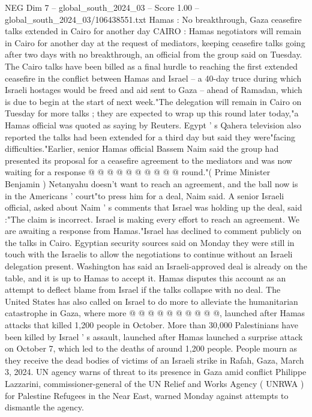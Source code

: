 \begin{textsample}{NEG Dim 7 – global\_south\_2024\_03 – Score 1.00 – global\_south\_2024\_03/106438551.txt}  \label{ex:f7_neg_296}
Hamas : No breakthrough, Gaza ceasefire talks extended in Cairo for another day CAIRO : Hamas negotiators will remain in Cairo for another day at the request of mediators, keeping ceasefire talks going after two days with no breakthrough, an official from the group said on Tuesday.
The Cairo talks have been billed as a final hurdle to reaching the first extended ceasefire in the conflict between Hamas and Israel -- a 40-day truce during which Israeli hostages would be freed and aid sent to Gaza -- ahead of Ramadan, which is due to begin at the start of next week."The delegation will remain in Cairo on Tuesday for more talks ; they are expected to wrap up this round later today,"a Hamas official was quoted as saying by Reuters.
Egypt ' s Qahera television also reported the talks had been extended for a third day but said they were"facing difficulties."Earlier, senior Hamas official Bassem Naim said the group had presented its proposal for a ceasefire agreement to the mediators and was now waiting for a response @ @ @ @ @ @ @ @ @ @ round."( Prime Minister Benjamin ) Netanyahu doesn't want to reach an agreement, and the ball now is in the Americans ' court"to press him for a deal, Naim said.
A senior Israeli official, asked about Naim ' s comments that Israel was holding up the deal, said :"The claim is incorrect.
Israel is making every effort to reach an agreement.
We are awaiting a response from Hamas."Israel has declined to comment publicly on the talks in Cairo.
Egyptian security sources said on Monday they were still in touch with the Israelis to allow the negotiations to continue without an Israeli delegation present.
Washington has said an Israeli-approved deal is already on the table, and it is up to Hamas to accept it.
Hamas disputes this account as an attempt to deflect blame from Israel if the talks collapse with no deal.
The United States has also called on Israel to do more to alleviate the humanitarian catastrophe in Gaza, where more @ @ @ @ @ @ @ @ @ @, launched after Hamas attacks that killed 1,200 people in October.
More than 30,000 Palestinians have been killed by Israel ' s assault, launched after Hamas launched a surprise attack on October 7, which led to the deaths of around 1,200 people.
People mourn as they receive the dead bodies of victims of an Israeli strike in Rafah, Gaza, March 3, 2024.
UN agency warns of threat to its presence in Gaza amid conflict Philippe Lazzarini, commissioner-general of the UN Relief and Works Agency ( UNRWA ) for Palestine Refugees in the Near East, warned Monday against attempts to dismantle the agency.

\end{textsample}
